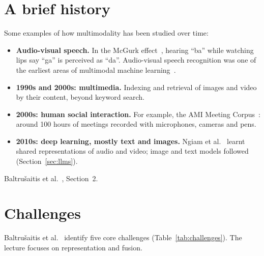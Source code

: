 \section{A brief history}
\label{sec:history}

Some examples of how multimodality has been studied over time:
\begin{itemize}
  \item \textbf{Audio-visual speech.} In the McGurk effect~\cite{mcgurk1976hearing},
        hearing ``ba'' while watching lips say ``ga'' is perceived as ``da''.
        Audio-visual speech recognition was one of the earliest areas of
        multimodal machine learning~\cite{baltrusaitis2019multimodal}.
  \item \textbf{1990s and 2000s: multimedia.} Indexing and retrieval of images and
        video by their content, beyond keyword search.
  \item \textbf{2000s: human social interaction.} For example, the AMI Meeting
        Corpus~\cite{mccowan2005ami}: around 100 hours of meetings recorded with
        microphones, cameras and pens.
  \item \textbf{2010s: deep learning, mostly text and images.} Ngiam et
        al.~\cite{ngiam2011multimodal} learnt shared representations of audio and
        video; image and text models followed (Section~\ref{sec:llms}).
\end{itemize}

\begin{furtherreading}
  \item Baltru\v{s}aitis et al.~\cite{baltrusaitis2019multimodal}, Section~2.
\end{furtherreading}


\section{Challenges}
\label{sec:challenges}

Baltru\v{s}aitis et al.~\cite{baltrusaitis2019multimodal} identify five core
challenges (Table~\ref{tab:challenges}). The lecture focuses on representation
and fusion.

